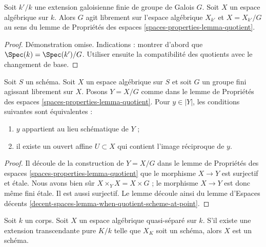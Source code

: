 \begin{lemma}
\label{lemma-base-change-by-Galois}
Soit $k'/k$ une extension galoisienne finie de groupe de Galois $G$.
Soit $X$ un espace algébrique sur $k$. Alors $G$ agit librement sur
l'espace algébrique $X_{k'}$ et $X = X_{k'}/G$ au sens du
lemme de Propriétés des espaces \ref{spaces-properties-lemma-quotient}.
\end{lemma}

\begin{proof}
Démonstration omise. Indications : montrer d'abord que $\Spec(k) = \Spec(k')/G$.
Utiliser ensuite la compatibilité des quotients avec le changement de base.
\end{proof}

\begin{lemma}
\label{lemma-when-quotient-scheme-at-point}
Soit $S$ un schéma. Soit $X$ un espace algébrique sur $S$ et
soit $G$ un groupe fini agissant librement sur $X$. Posons $Y = X/G$ comme
dans le lemme de Propriétés des espaces \ref{spaces-properties-lemma-quotient}.
Pour $y \in |Y|$, les conditions suivantes sont équivalentes :
\begin{enumerate}
\item $y$ appartient au lieu schématique de $Y$ ;
\item il existe un ouvert affine $U \subset X$
qui contient l'image réciproque de $y$.
\end{enumerate}
\end{lemma}

\begin{proof}
Il découle de la construction de $Y = X/G$ dans le
lemme de Propriétés des espaces \ref{spaces-properties-lemma-quotient}
que le morphisme $X \to Y$ est surjectif et \'etale.
Nous avons bien sûr $X \times_Y X = X \times G$ ; le morphisme
$X \to Y$ est donc même fini étale. Il est aussi surjectif.
Le lemme découle ainsi du
lemme d'Espaces décents \ref{decent-spaces-lemma-when-quotient-scheme-at-point}.
\end{proof}

\begin{lemma}
\label{lemma-scheme-after-purely-transcendental-base-change}
Soit $k$ un corps. Soit $X$ un espace algébrique
quasi-séparé sur $k$. S'il existe une extension transcendante pure
$K/k$ telle que $X_K$ soit un schéma, alors
$X$ est un schéma.
\end{lemma}

